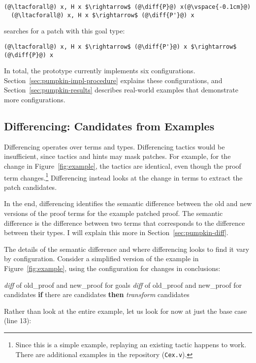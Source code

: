 \begin{lstlisting}[language=coq]
  (@\ltacforall@) x, H x $\rightarrow$ (@\diff{P}@) x(@\vspace{-0.1cm}@)
  (@\ltacforall@) x, H x $\rightarrow$ (@\diff{P'}@) x
\end{lstlisting}
\sysname searches for a patch with this goal type:

\begin{lstlisting}[language=coq]
  (@\ltacforall@) x, H x $\rightarrow$ (@\diff{P'}@) x $\rightarrow$ (@\diff{P}@) x
\end{lstlisting}

In total, the \sysname prototype currently implements six configurations.
Section~\ref{sec:pumpkin-impl-procedure} explains these configurations,
and Section~\ref{sec:pumpkin-results} describes real-world examples that demonstrate more configurations.

\subsection{Differencing: Candidates from Examples}
\label{sec:pumpkin-spec-diff}

Differencing operates over terms and types. Differencing tactics
would be insufficient, since tactics and hints may mask patches.
For example, for the change in Figure~\ref{fig:example},
the tactics are identical, even though the proof term changes.\footnote{Since this is a simple example, replaying an existing tactic happens to work. There
are additional examples in the repository (\lstinline{Cex.v}).} %
Differencing instead looks at the change in terms to extract the patch candidates.

In the end, differencing identifies the semantic difference between the old and new versions of the proof terms for the example patched proof.
The semantic difference is the difference between two terms that corresponds to the difference between their types.
I will explain this more in Section~\ref{sec:pumpkin-diff}.

The details of the semantic difference and where differencing looks to find it vary by configuration.
Consider a simplified version of the example in Figure~\ref{fig:example}, using the configuration for changes in conclusions:

\begin{algorithm}
\footnotesize
\begin{algorithmic}[1]
    \STATE \textit{diff}  of old\_proof and new\_proof for goals
    \STATE \textit{diff}  of old\_proof and new\_proof for candidates
    \STATE \textbf{if} there are candidates \textbf{then}
    \STATE \hspace*{1em} \textit{transform} candidates
\end{algorithmic}
\end{algorithm}
Rather than look at the entire example, let us look for now at just the base case (line 13):

